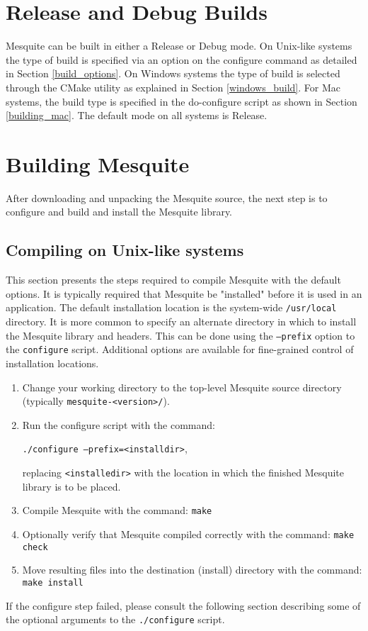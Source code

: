 \section{Release and Debug Builds}
Mesquite can be built in either a Release or Debug mode. On Unix-like systems the type of build is specified via an option on the configure command as detailed in Section \ref{build_options}. On Windows systems the type of build is selected through the CMake utility as explained in Section \ref{windows_build}. For Mac systems, the build type is specified in the do-configure script as shown in Section \ref{building_mac}.  The default mode on all systems is Release.


\section{Building Mesquite}
\label{sec:compiling}
After downloading and unpacking the Mesquite source, the next step is to 
configure and build and install the Mesquite library.  
\subsection{Compiling on Unix-like systems}
This section presents the steps required to compile Mesquite with the default
options.  It is typically required
that Mesquite be "installed" before it is used in an application.  The default 
installation location is the system-wide \texttt{/usr/local} directory.  
It is more common to specify an alternate directory in which to install 
the Mesquite library and headers.  This can be done using the \texttt{--prefix}
option to the \texttt{configure} script.  Additional options are available for
fine-grained control of installation locations.
\begin{enumerate}
\item Change your working directory to the top-level Mesquite source
      directory (typically \texttt{mesquite-<version>/}).
\item Run the configure script with the command: 
\begin{center}
\texttt{./configure --prefix=<installdir>},
\end{center}
      replacing \texttt{<installedir>} with the location in which the finished
      Mesquite library is to be placed.
\item Compile Mesquite with the command: \texttt{make} 
\item Optionally verify that Mesquite compiled correctly with the command: \texttt{make check}
\item Move resulting files into the destination (install) directory with the command: \texttt{make install}
\end{enumerate}
If the configure step failed, please consult the following section describing 
some of the optional arguments to the \texttt{./configure} script. 


